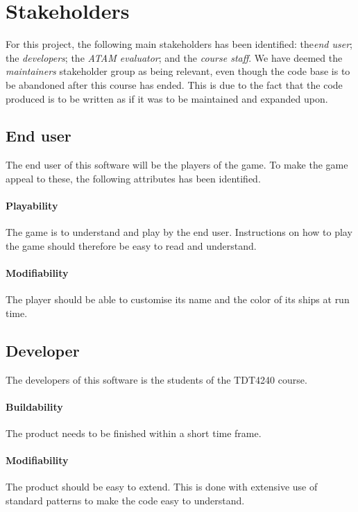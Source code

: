 \chapter{Stakeholders}
\label{cha:stakeholders}
For this project, the following main stakeholders has been identified: the\emph{end user}; the \emph{developers}; the \emph{ATAM evaluator}; and the \emph{course staff}. We have deemed the \emph{maintainers} stakeholder group as being relevant, even though the code base is to be abandoned after this course has ended. This is due to the fact that the code produced is to be written as if it was to be maintained and expanded upon.

    
    \section{End user}
    The end user of this software will be the players of the game. To make the game appeal to these, the following attributes has been identified.

        \subsubsection*{Playability}
        The game is to understand and play by the end user. Instructions on how to play the game should therefore be easy to read and understand.

        \subsubsection*{Modifiability}
        The player should be able to customise its name and the color of its ships at run time.
    
    
    \section{Developer}
    The developers of this software is the students of the TDT4240 course.

        \subsubsection*{Buildability}
        The product needs to be finished within a short time frame.
        
        \subsubsection*{Modifiability}
        The product should be easy to extend. This is done with extensive use of standard patterns to make the code easy to understand.

